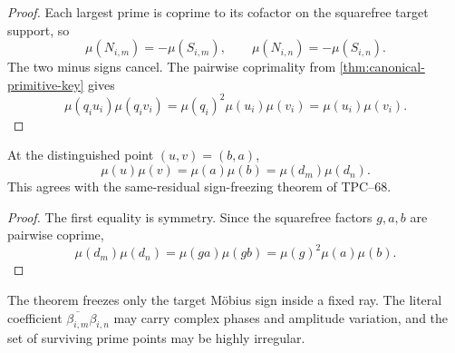 \begin{proof}
Each largest prime is coprime to its cofactor on the squarefree target
support, so
\[
 \mu(N_{i,m})=-\mu(S_{i,m}),\qquad
 \mu(N_{i,n})=-\mu(S_{i,n}).
\]
The two minus signs cancel.  The pairwise coprimality from
\cref{thm:canonical-primitive-key} gives
\[
 \mu(q_i u_i)\mu(q_i v_i)
 =
 \mu(q_i)^2\mu(u_i)\mu(v_i)
 =
 \mu(u_i)\mu(v_i).
\]
\end{proof}

\begin{corollary}
\label{cor:same-residual-sign-check}
At the distinguished point \((u,v)=(b,a)\),
\[
 \mu(u)\mu(v)=\mu(a)\mu(b)
 =\mu(d_m)\mu(d_n).
\]
This agrees with the same-residual sign-freezing theorem of TPC--68.
\end{corollary}

\begin{proof}
The first equality is symmetry.  Since the squarefree factors
\(g,a,b\) are pairwise coprime,
\[
 \mu(d_m)\mu(d_n)
 =\mu(ga)\mu(gb)
 =\mu(g)^2\mu(a)\mu(b).
\]
\end{proof}

\begin{remark}
The theorem freezes only the target M\"obius sign inside a fixed ray.
The literal coefficient
\(\overline{\beta_{i,m}}\beta_{i,n}\) may carry complex phases and
amplitude variation, and the set of surviving prime points may be highly
irregular.
\end{remark}

